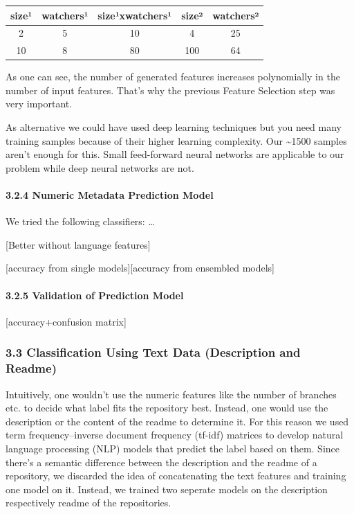 \documentclass{article}
\begin{document}
\begin{longtable}[]{@{}ccccc@{}}
\toprule
size¹ & watchers¹ & size¹xwatchers¹ & size² & watchers²\tabularnewline
\midrule
\endhead
2 & 5 & 10 & 4 & 25\tabularnewline
10 & 8 & 80 & 100 & 64\tabularnewline
\bottomrule
\end{longtable}

As one can see, the number of generated features increases polynomially
in the number of input features. That's why the previous Feature
Selection step was very important.

As alternative we could have used deep learning techniques but you need
many training samples because of their higher learning complexity. Our
\textasciitilde{}1500 samples aren't enough for this. Small feed-forward
neural networks are applicable to our problem while deep neural networks
are not.

\paragraph{3.2.4 Numeric Metadata Prediction
Model}\label{numeric-metadata-prediction-model}

We tried the following classifiers: \ldots{}

{[}Better without language features{]}

{[}accuracy from single models{]}{[}accuracy from ensembled models{]}

\paragraph{3.2.5 Validation of Prediction
Model}\label{validation-of-prediction-model}

{[}accuracy+confusion matrix{]}

\subsubsection{3.3 Classification Using Text Data (Description and
Readme)}\label{classification-using-text-data-description-and-readme}

Intuitively, one wouldn't use the numeric features like the number of
branches etc. to decide what label fits the repository best. Instead,
one would use the description or the content of the readme to determine
it. For this reason we used term frequency--inverse document frequency
(tf-idf) matrices to develop natural language processing (NLP) models
that predict the label based on them. Since there's a semantic
difference between the description and the readme of a repository, we
discarded the idea of concatenating the text features and training one
model on it. Instead, we trained two seperate models on the description
respectively readme of the repositories.
\end{document}
